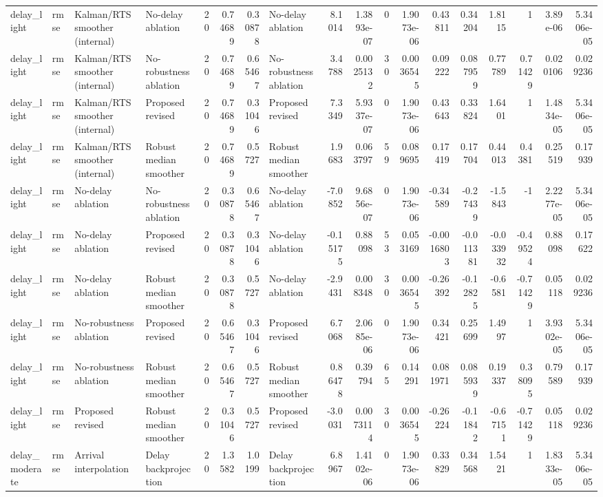 \begin{table}[!htbp]
{\begin{tabular}{llllrrrlrrrrrrrrrr}
delay_light & rmse & Kalman/RTS smoother (internal) & No-delay ablation & 20 & 0.74689 & 0.30878 & No-delay ablation & 8.1014 & 1.3893e-07 & 0 & 1.9073e-06 & 0.43811 & 0.34204 & 1.8115 & 1 & 3.89e-06 & 5.3406e-05 \\
delay_light & rmse & Kalman/RTS smoother (internal) & No-robustness ablation & 20 & 0.74689 & 0.65467 & No-robustness ablation & 3.4788 & 0.0025132 & 30 & 0.0036545 & 0.09222 & 0.087959 & 0.77789 & 0.71429 & 0.020106 & 0.029236 \\
delay_light & rmse & Kalman/RTS smoother (internal) & Proposed revised & 20 & 0.74689 & 0.31046 & Proposed revised & 7.3349 & 5.9337e-07 & 0 & 1.9073e-06 & 0.43643 & 0.33824 & 1.6401 & 1 & 1.4834e-05 & 5.3406e-05 \\
delay_light & rmse & Kalman/RTS smoother (internal) & Robust median smoother & 20 & 0.74689 & 0.5727 & Robust median smoother & 1.9683 & 0.063797 & 59 & 0.089695 & 0.17419 & 0.17704 & 0.44013 & 0.4381 & 0.25519 & 0.17939 \\
delay_light & rmse & No-delay ablation & No-robustness ablation & 20 & 0.30878 & 0.65467 & No-delay ablation & -7.0852 & 9.6856e-07 & 0 & 1.9073e-06 & -0.34589 & -0.27439 & -1.5843 & -1 & 2.2277e-05 & 5.3406e-05 \\
delay_light & rmse & No-delay ablation & Proposed revised & 20 & 0.30878 & 0.31046 & No-delay ablation & -0.15175 & 0.88098 & 53 & 0.053169 & -0.0016803 & -0.011381 & -0.033932 & -0.49524 & 0.88098 & 0.17622 \\
delay_light & rmse & No-delay ablation & Robust median smoother & 20 & 0.30878 & 0.5727 & No-delay ablation & -2.9431 & 0.008348 & 30 & 0.0036545 & -0.26392 & -0.12825 & -0.6581 & -0.71429 & 0.05118 & 0.029236 \\
delay_light & rmse & No-robustness ablation & Proposed revised & 20 & 0.65467 & 0.31046 & Proposed revised & 6.7068 & 2.0685e-06 & 0 & 1.9073e-06 & 0.34421 & 0.25699 & 1.4997 & 1 & 3.9302e-05 & 5.3406e-05 \\
delay_light & rmse & No-robustness ablation & Robust median smoother & 20 & 0.65467 & 0.5727 & Robust median smoother & 0.86478 & 0.39794 & 65 & 0.14291 & 0.081971 & 0.085939 & 0.19337 & 0.38095 & 0.79589 & 0.17939 \\
delay_light & rmse & Proposed revised & Robust median smoother & 20 & 0.31046 & 0.5727 & Proposed revised & -3.0031 & 0.0073114 & 30 & 0.0036545 & -0.26224 & -0.11842 & -0.67151 & -0.71429 & 0.05118 & 0.029236 \\
delay_moderate & rmse & Arrival interpolation & Delay backprojection & 20 & 1.3582 & 1.0199 & Delay backprojection & 6.8967 & 1.4102e-06 & 0 & 1.9073e-06 & 0.33829 & 0.34568 & 1.5421 & 1 & 1.8333e-05 & 5.3406e-05 \\

\end{tabular}}
\end{table}
